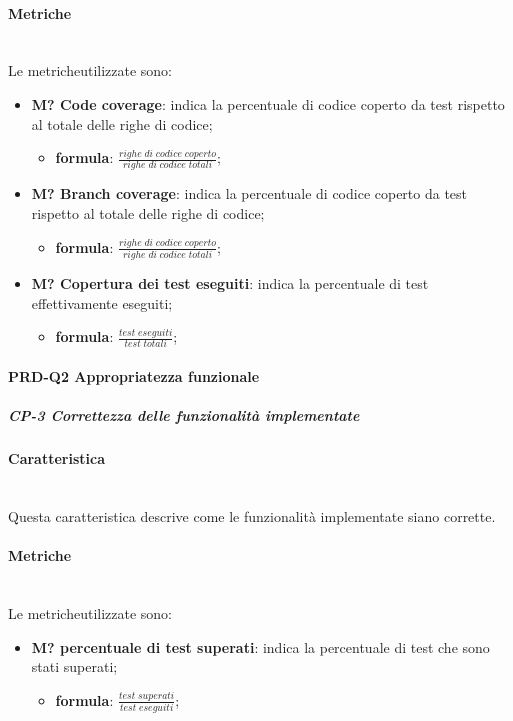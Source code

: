 		\paragraph*{Metriche}\mbox{}\\ [1mm]
		Le metriche\glosp utilizzate sono:
		\begin{itemize}
			\item \textbf{M? Code coverage}: indica la percentuale di codice coperto da test rispetto al totale delle righe di codice;
			\begin{itemize}
				\item[] \textbf{formula}: $\frac{righe \; di \; codice \; coperto}{righe \; di \; codice \; totali}$;
			\end{itemize} 
		
			\item \textbf{M? Branch coverage}: indica la percentuale di codice coperto da test rispetto al totale delle righe di codice;
			\begin{itemize}
				\item[] \textbf{formula}: $\frac{righe \; di \; codice \; coperto}{righe \; di \; codice \; totali}$;
			\end{itemize} 
		
			\item \textbf{M? Copertura dei test eseguiti}: indica la percentuale di test effettivamente eseguiti;
			\begin{itemize}
				\item[] \textbf{formula}: $\frac{test \; eseguiti}{test \; totali}$;
			\end{itemize} 
		\end{itemize}
	\paragraph{PRD-Q2 Appropriatezza funzionale}
		\subparagraph{CP-3 Correttezza delle funzionalità implementate}
		\paragraph*{Caratteristica}\mbox{}\\ [1mm]
		Questa caratteristica descrive come le funzionalità implementate siano corrette.
		\paragraph*{Metriche}\mbox{}\\ [1mm]
		Le metriche\glosp utilizzate sono:
		\begin{itemize}
			\item \textbf{M? percentuale di test superati}: indica la percentuale di test che sono stati superati;
			\begin{itemize}
				\item[] \textbf{formula}: $\frac{test \; superati}{test \; eseguiti}$;
			\end{itemize}
		\end{itemize}
	
